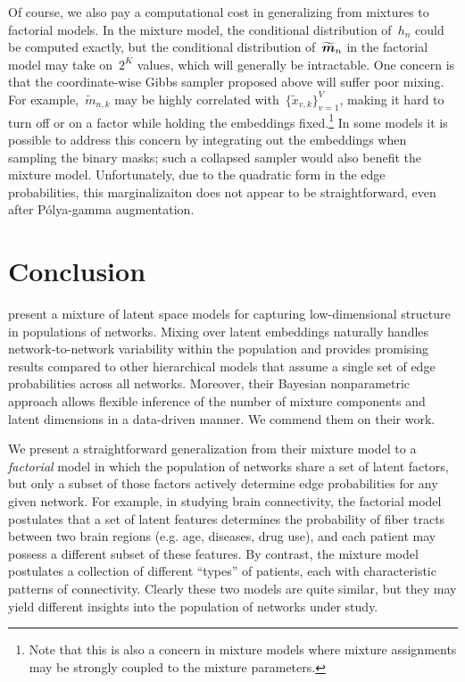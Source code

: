 Of course, we also pay a computational cost in generalizing from
mixtures to factorial models.  In the mixture model, the conditional
distribution of~$h_n$ could be computed exactly, but the conditional
distribution of~$\widetilde{\boldsymbol{m}}_n$ in the factorial model may take
on~$2^K$ values, which will generally be intractable.  One concern is
that the coordinate-wise Gibbs sampler proposed above will suffer poor
mixing. For example,~$\widetilde{m}_{n,k}$ may be highly correlated
with~$\{\widetilde{x}_{v,k}\}_{v=1}^V$, making it hard to turn off
or on a factor while holding the embeddings fixed.\footnote{Note that
  this is also a concern in mixture models where mixture assignments
  may be strongly coupled to the mixture parameters.} In some models
it is possible to address this concern by integrating out the
embeddings when sampling the binary masks; such a collapsed sampler
would also benefit the mixture model.  Unfortunately, due to the
quadratic form in the edge probabilities, this marginalizaiton
does not appear to be straightforward, even after P\'{o}lya-gamma
augmentation.


\section{Conclusion}
\citet{durante2016nonparametric} present a mixture of latent space
models for capturing low-dimensional structure in populations of
networks.  Mixing over latent embeddings naturally handles network-to-network
variability within the population and provides promising results
compared to other hierarchical models that assume a single set of
edge probabilities across all networks.  Moreover, their Bayesian
nonparametric approach allows flexible inference of the number of
mixture components and latent dimensions in a data-driven manner.
We commend them on their work.

We present a straightforward generalization from their mixture
model to a \emph{factorial} model in which the population of
networks share a set of latent factors, but only a subset of those
factors actively determine edge probabilities for any given network.
For example, in studying brain connectivity, the factorial model postulates
that a set of latent features determines the probability of fiber
tracts between two brain regions (e.g. age, diseases, drug use), and
each patient may possess a different subset of these features. By contrast,
the mixture model postulates a collection of different ``types'' of
patients, each with characteristic patterns of connectivity.  Clearly
these two models are quite similar, but they may yield different
insights into the population of networks under study.





